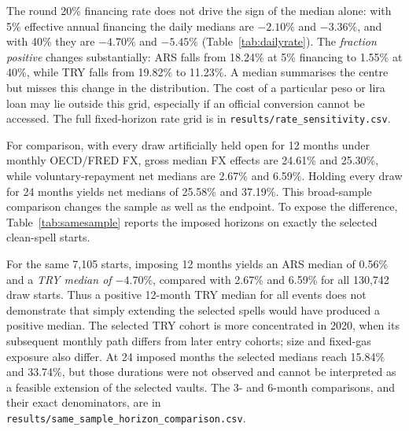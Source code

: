 \documentclass[sn-vancouver,Numbered]{sn-jnl}
\begin{document}
\begin{table}[t]
\caption{Borrowing-rate sensitivity for the 7,105 selected observed-duration spells per currency using daily official reference marks. Effective annual rates and net benefit measures are percent; the fee, conversion and gas assumptions stay fixed. Rates are illustrative scenarios, not observed offers.}
\label{tab:dailyrate}\centering\small

\end{table}
The round 20\% financing rate does not drive the sign of the median alone: with 5\% effective annual financing the daily medians are $-2.10\%$ and $-3.36\%$, and with 40\% they are $-4.70\%$ and $-5.45\%$ (Table~\ref{tab:dailyrate}). The \emph{fraction positive} changes substantially: ARS falls from 18.24\% at 5\% financing to 1.55\% at 40\%, while TRY falls from 19.82\% to 11.23\%. A median summarises the centre but misses this change in the distribution. The cost of a particular peso or lira loan may lie outside this grid, especially if an official conversion cannot be accessed. The full fixed-horizon rate grid is in \texttt{results/rate\_sensitivity.csv}.

For comparison, with every draw artificially held open for 12 months under monthly OECD/FRED FX, gross median FX effects are 24.61\% and 25.30\%, while voluntary-repayment net medians are 2.67\% and 6.59\%. Holding every draw for 24 months yields net medians of 25.58\% and 37.19\%. This broad-sample comparison changes the sample as well as the endpoint. To expose the difference, Table~\ref{tab:samesample} reports the imposed horizons on exactly the selected clean-spell starts.

\begin{table}[htbp]
\caption{Keeping the selected clean-spell starts fixed while changing observed versus imposed endpoints, then comparing those fixed endpoints with the full draw sample. Each observed row uses the actual selected duration; every imposed month uses OECD/FRED monthly FX and the stated annual rate. Median and positive are percentages. A same-start comparison holds membership fixed, but changes both duration and the part of the historical FX path sampled.}
\label{tab:samesample}\centering\small

\end{table}
For the same 7,105 starts, imposing 12 months yields an ARS median of 0.56\% and a \emph{TRY median of $-4.70\%$}, compared with 2.67\% and 6.59\% for all 130,742 draw starts. Thus a positive 12-month TRY median for all events does not demonstrate that simply extending the selected spells would have produced a positive median. The selected TRY cohort is more concentrated in 2020, when its subsequent monthly path differs from later entry cohorts; size and fixed-gas exposure also differ. At 24 imposed months the selected medians reach 15.84\% and 33.74\%, but those durations were not observed and cannot be interpreted as a feasible extension of the selected vaults. The 3- and 6-month comparisons, and their exact denominators, are in \texttt{results/same\_sample\_horizon\_comparison.csv}.
\end{document}
